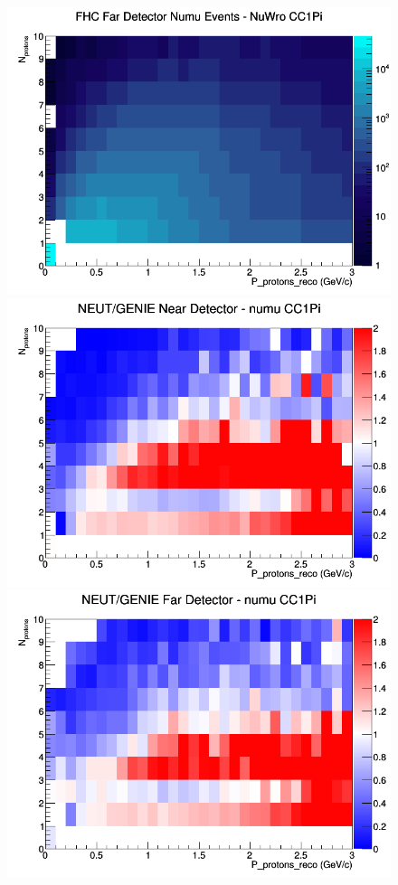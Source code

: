 \documentclass[12pt]{article}
\begin{document}
\begin{figure}[h]
\endminipage
{}
\includegraphics[width=\linewidth]{eff_N_P/GAr/protons/CC1Pi_FHC_FD_numu_N_P_NuWro.png}
\endminipage
\newline
{}
\includegraphics[width=\linewidth]{eff_N_P/GAr/protons/ratios/CC1Pi_NEUT_GENIE_numu_near_N_P.png}
\endminipage
{}
\includegraphics[width=\linewidth]{eff_N_P/GAr/protons/ratios/CC1Pi_NEUT_GENIE_numu_far_N_P.png}

\end{figure}
\end{document}
